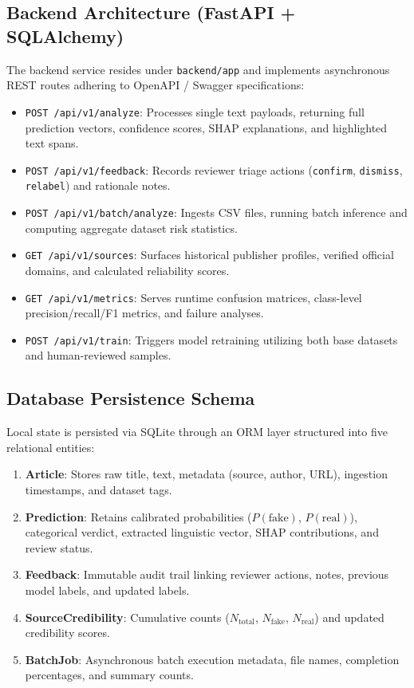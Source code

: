 \documentclass[11pt,a4paper]{article}
\begin{document}
\subsection{Backend Architecture (FastAPI + SQLAlchemy)}
The backend service resides under \texttt{backend/app} and implements asynchronous REST routes adhering to OpenAPI / Swagger specifications:
\begin{itemize}[noitemsep]
    \item \texttt{POST /api/v1/analyze}: Processes single text payloads, returning full prediction vectors, confidence scores, SHAP explanations, and highlighted text spans.
    \item \texttt{POST /api/v1/feedback}: Records reviewer triage actions (\texttt{confirm}, \texttt{dismiss}, \texttt{relabel}) and rationale notes.
    \item \texttt{POST /api/v1/batch/analyze}: Ingests CSV files, running batch inference and computing aggregate dataset risk statistics.
    \item \texttt{GET /api/v1/sources}: Surfaces historical publisher profiles, verified official domains, and calculated reliability scores.
    \item \texttt{GET /api/v1/metrics}: Serves runtime confusion matrices, class-level precision/recall/F1 metrics, and failure analyses.
    \item \texttt{POST /api/v1/train}: Triggers model retraining utilizing both base datasets and human-reviewed samples.
\end{itemize}

\subsection{Database Persistence Schema}
Local state is persisted via SQLite through an ORM layer structured into five relational entities:
\begin{enumerate}[noitemsep]
    \item \textbf{Article}: Stores raw title, text, metadata (source, author, URL), ingestion timestamps, and dataset tags.
    \item \textbf{Prediction}: Retains calibrated probabilities ($P(\text{fake})$, $P(\text{real})$), categorical verdict, extracted linguistic vector, SHAP contributions, and review status.
    \item \textbf{Feedback}: Immutable audit trail linking reviewer actions, notes, previous model labels, and updated labels.
    \item \textbf{SourceCredibility}: Cumulative counts ($N_{\text{total}}$, $N_{\text{fake}}$, $N_{\text{real}}$) and updated credibility scores.
    \item \textbf{BatchJob}: Asynchronous batch execution metadata, file names, completion percentages, and summary counts.
\end{enumerate}
\end{document}
